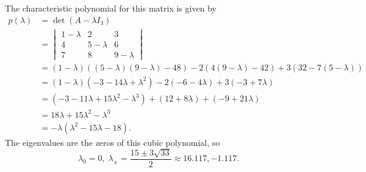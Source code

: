 \item

The characteristic polynomial for this matrix is given by
\begin{align*}
    p(\lambda)
    &= \det\left( A-\lambda I_3 \right) \\
    &= \begin{vmatrix}
        1 - \lambda & 2           & 3           \\
        4           & 5 - \lambda & 6           \\
        7           & 8           & 9 - \lambda
    \end{vmatrix} \\
    &= (1-\lambda) \left(
        (5 - \lambda)(9 - \lambda) - 48
    \right) - 2 \left(
        4(9 - \lambda) - 42
    \right) + 3 \left(
        32 - 7(5 - \lambda)
    \right) \\
    &= (1-\lambda) \left( -3 - 14\lambda + \lambda^2 \right)
     - 2(-6 - 4\lambda) + 3(-3 + 7\lambda) \\
    &= \left( -3 - 11\lambda + 15\lambda^2 - \lambda^3 \right)
     + (12 + 8\lambda) + (-9 + 21\lambda) \\
    &= 18\lambda + 15\lambda^2 - \lambda^3 \\
    &= -\lambda \left( \lambda^2 - 15\lambda - 18 \right).
\end{align*}
The eigenvalues are the zeros of this cubic polynomial, so
\[
    \lambda_0 = 0,\;
    \lambda_{\pm}
    = \frac{15 \pm 3\sqrt{33}}{2}
    \approx 16.117, -1.117.
\]


